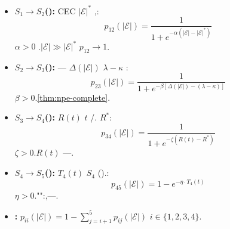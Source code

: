 \documentclass[12pt,a4paper]{article}
\theoremstyle{definition}
\theoremstyle{remark}
\begin{document}
\begin{itemize}[itemsep=4pt]
\item \textbf{$S_1 \to S_2$():} CEC $|\mathcal{E}|^*$ ,:
\begin{equation}
p_{12}(|\mathcal{E}|) = \frac{1}{1 + e^{-\alpha (|\mathcal{E}| - |\mathcal{E}|^*)}}
\label{eq:p12}
\end{equation}
 $\alpha > 0$ .$|\mathcal{E}| \gg |\mathcal{E}|^*$  $p_{12} \to 1$.

\item \textbf{$S_2 \to S_3$():} --- $\Delta(|\mathcal{E}|)$  $\lambda - \kappa$ :
\begin{equation}
p_{23}(|\mathcal{E}|) = \frac{1}{1 + e^{-\beta [\Delta(|\mathcal{E}|) - (\lambda - \kappa)]}}
\label{eq:p23}
\end{equation}
 $\beta > 0$.\ref{thm:npe-complete}.

\item \textbf{$S_3 \to S_4$():}  $R(t)$  $t$ /. $R^*$:
\begin{equation}
p_{34}(|\mathcal{E}|) = \frac{1}{1 + e^{-\zeta (R(t) - R^*)}}
\label{eq:p34}
\end{equation}
 $\zeta > 0$.$R(t)$ ---.

\item \textbf{$S_4 \to S_5$():}  $T_4(t)$  $S_4$ ().:
\begin{equation}
p_{45}(|\mathcal{E}|) = 1 - e^{-\eta \cdot T_4(t)}
\label{eq:p45}
\end{equation}
 $\eta > 0$."":,---.

\item \textbf{:} $p_{ii}(|\mathcal{E}|) = 1 - \sum_{j=i+1}^{5} p_{ij}(|\mathcal{E}|)$  $i \in \{1,2,3,4\}$.
\end{itemize}
\end{document}
